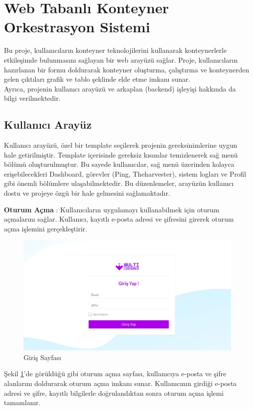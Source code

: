 \section{Web Tabanlı Konteyner Orkestrasyon Sistemi}\label{sec:project}
Bu proje, kullanıcıların konteyner teknolojilerini kullanarak konteynerlerle etkileşimde bulunmasını sağlayan bir web arayüzü sağlar. Proje, kullanıcıların hazırlanan bir formu doldurarak konteyner oluşturma, çalıştırma ve konteynerden gelen çıktıları grafik ve tablo şeklinde elde etme imkanı sunar.\\
Ayrıca, projenin kullanıcı arayüzü ve arkaplan (backend) işleyişi hakkında da bilgi verilmektedir.
\subsection{Kullanıcı Arayüz}
Kullanıcı arayüzü, özel bir template seçilerek projenin gereksinimlerine uygun hale getirilmiştir. Template içerisinde gereksiz kısımlar temizlenerek sağ menü bölümü oluşturulmuştur. Bu sayede kullanıcılar, sağ menü üzerinden kolayca erişebilecekleri Dashboard, görevler (Ping, Theharvester), sistem logları ve Profil gibi önemli bölümlere ulaşabilmektedir. Bu düzenlemeler, arayüzün kullanıcı dostu ve projeye özgü bir hale gelmesini sağlamaktadır.

\textbf{Oturum Açma} : Kullanıcıların uygulamayı kullanabilmek için oturum açmalarını sağlar. Kullanıcı, kayıtlı e-posta adresi ve şifresini girerek oturum açma işlemini gerçekleştirir.
\begin{figure}[ht]
	\centering
	\includegraphics[width=0.7\linewidth]{images/login.jpeg}
	\caption{Giriş Sayfası}
	\label{fig:login}
\end{figure}

Şekil \ref{fig:login}'de görüldüğü gibi oturum açma sayfası, kullanıcıya e-posta ve şifre alanlarını doldurarak oturum açma imkanı sunar. Kullanıcının girdiği e-posta adresi ve şifre, kayıtlı bilgilerle doğrulandıktan sonra oturum açma işlemi tamamlanır.

